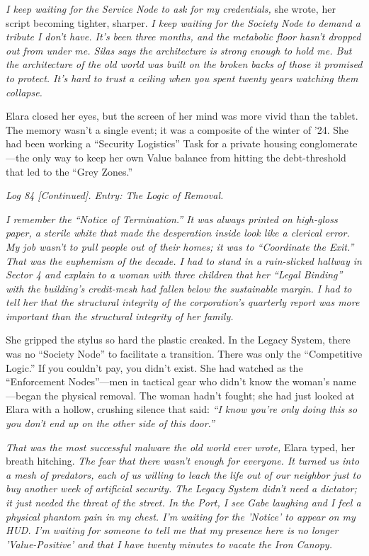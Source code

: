 \textit{I keep waiting for the Service Node to ask for my credentials,} she wrote, her script becoming tighter, sharper. \textit{I keep waiting for the Society Node to demand a tribute I don't have. It's been three months, and the metabolic floor hasn't dropped out from under me. Silas says the architecture is strong enough to hold me. But the architecture of the old world was built on the broken backs of those it promised to protect. It's hard to trust a ceiling when you spent twenty years watching them collapse.}


Elara closed her eyes, but the screen of her mind was more vivid than the tablet. The memory wasn't a single event; it was a composite of the winter of '24. She had been working a ``Security Logistics'' Task for a private housing conglomerate—the only way to keep her own Value balance from hitting the debt-threshold that led to the ``Grey Zones.''

\textit{Log 84 [Continued]. Entry: The Logic of Removal.}

\textit{I remember the ``Notice of Termination.'' It was always printed on high-gloss paper, a sterile white that made the desperation inside look like a clerical error. My job wasn't to pull people out of their homes; it was to ``Coordinate the Exit.'' That was the euphemism of the decade. I had to stand in a rain-slicked hallway in Sector 4 and explain to a woman with three children that her ``Legal Binding'' with the building's credit-mesh had fallen below the sustainable margin. I had to tell her that the structural integrity of the corporation's quarterly report was more important than the structural integrity of her family.}

She gripped the stylus so hard the plastic creaked. In the Legacy System, there was no ``Society Node'' to facilitate a transition. There was only the ``Competitive Logic.'' If you couldn't pay, you didn't exist. She had watched as the ``Enforcement Nodes''—men in tactical gear who didn't know the woman's name—began the physical removal. The woman hadn't fought; she had just looked at Elara with a hollow, crushing silence that said: \textit{``I know you're only doing this so you don't end up on the other side of this door.''}

\textit{That was the most successful malware the old world ever wrote,} Elara typed, her breath hitching. \textit{The fear that there wasn't enough for everyone. It turned us into a mesh of predators, each of us willing to leach the life out of our neighbor just to buy another week of artificial security. The Legacy System didn't need a dictator; it just needed the threat of the street. In the Port, I see Gabe laughing and I feel a physical phantom pain in my chest. I'm waiting for the 'Notice' to appear on my HUD. I'm waiting for someone to tell me that my presence here is no longer 'Value-Positive' and that I have twenty minutes to vacate the Iron Canopy.}

